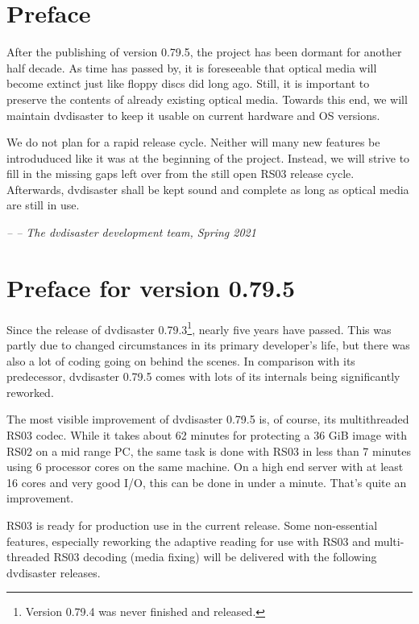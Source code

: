 \section*{Preface}
\label{preface}

After the publishing of version 0.79.5, the project has been dormant for another half decade. As time has passed by, it is foreseeable that optical media will become extinct just like floppy discs did long ago. Still, it is important to preserve the contents of already existing optical media. Towards this end, we will maintain dvdisaster to keep it usable on current hardware and OS versions.

We do not plan for a rapid release cycle. Neither will many new features be introduduced like it was at the beginning of the project. Instead, we will strive to fill in the missing gaps left over from the still open RS03 release cycle. Afterwards, dvdisaster shall be kept sound and complete as long as optical media are still in use.

\bigskip

{\em -- -- The dvdisaster development team, Spring 2021}


\newpage
\section*{Preface for version 0.79.5}

Since the release of dvdisaster 0.79.3\footnote{Version 0.79.4 was never finished
and released.}, nearly five years have passed.
This was partly due to changed circumstances in its
primary developer's life, but there was also a lot of
coding going on behind the scenes. In comparison with its
predecessor, dvdisaster 0.79.5 comes with lots of its
internals being significantly reworked.

\smallskip

The most visible improvement  of dvdisaster 0.79.5 is, of
course, its multithreaded RS03 codec. While it takes
about 62 minutes for protecting a 36 GiB image with RS02
on a mid range PC,
the same task is done with RS03 in less than 7 minutes
using 6 processor cores on the same machine.
On a high end server with at least 16 cores and very good I/O,
this can be done in under a minute. That's quite an
improvement.

RS03 is ready for production use in the current release.
Some non-essential features, especially reworking the
adaptive reading for use with RS03 and multi-threaded
RS03 decoding (media fixing) will be delivered with
the following dvdisaster releases.

